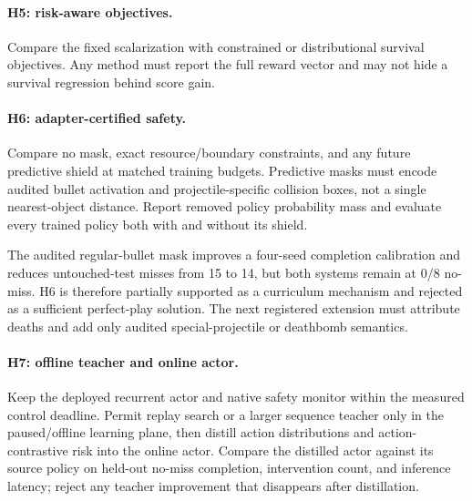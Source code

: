 \documentclass[10pt]{article}
\begin{document}
\paragraph{H5: risk-aware objectives.}
Compare the fixed scalarization with constrained or distributional survival
objectives.  Any method must report the full reward vector and may not hide a
survival regression behind score gain.

\paragraph{H6: adapter-certified safety.}
Compare no mask, exact resource/boundary constraints, and any future predictive
shield at matched training budgets.  Predictive masks must encode audited
bullet activation and projectile-specific collision boxes, not a single
nearest-object distance.  Report removed policy probability mass and evaluate
every trained policy both with and without its shield.

The audited regular-bullet mask improves a four-seed completion calibration
and reduces untouched-test misses from 15 to 14, but both systems remain at
0/8 no-miss.  H6 is therefore partially supported as a curriculum mechanism
and rejected as a sufficient perfect-play solution.  The next registered
extension must attribute deaths and add only audited special-projectile or
deathbomb semantics.

\paragraph{H7: offline teacher and online actor.}
Keep the deployed recurrent actor and native safety monitor within the measured
control deadline.  Permit replay search or a larger sequence teacher only in
the paused/offline learning plane, then distill action distributions and
action-contrastive risk into the online actor.  Compare the distilled actor
against its source policy on held-out no-miss completion, intervention count,
and inference latency; reject any teacher improvement that disappears after
distillation.
\end{document}
